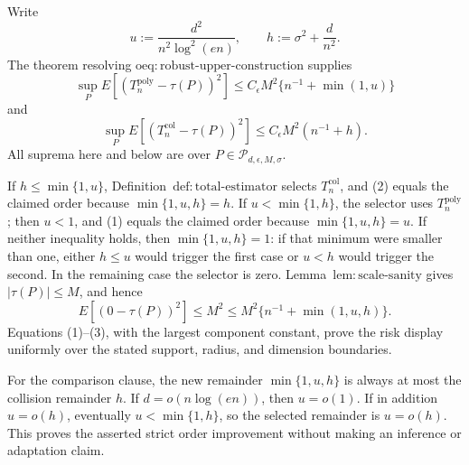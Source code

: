 Write
\[
 u:=\frac{d^2}{n^2\log^2(en)},\qquad h:=\sigma^2+\frac d{n^2}.
\]
The theorem resolving \(\mathrm{oeq:robust\text{-}upper\text{-}construction}\) supplies
\[
 \sup_PE[(T_n^{\mathrm{poly}}-\tau(P))^2]
 \le C_{\epsilon}M^2\{n^{-1}+\min(1,u)\}
\tag{1}
\]
and
\[
 \sup_PE[(T_n^{\mathrm{col}}-\tau(P))^2]
 \le C_{\epsilon}M^2(n^{-1}+h).
\tag{2}
\]
All suprema here and below are over \(P\in\mathcal P_{d,\epsilon,M,\sigma}\).

If \(h\le\min\{1,u\}\), Definition~\(\mathrm{def:total\text{-}estimator}\) selects \(T_n^{\mathrm{col}}\), and (2) equals the claimed order because \(\min\{1,u,h\}=h\).  If \(u<\min\{1,h\}\), the selector uses \(T_n^{\mathrm{poly}}\); then \(u<1\), and (1) equals the claimed order because \(\min\{1,u,h\}=u\).  If neither inequality holds, then \(\min\{1,u,h\}=1\): if that minimum were smaller than one, either \(h\le u\) would trigger the first case or \(u<h\) would trigger the second.  In the remaining case the selector is zero.  Lemma~\(\mathrm{lem:scale\text{-}sanity}\) gives \(|\tau(P)|\le M\), and hence
\[
 E[(0-\tau(P))^2]\le M^2\le M^2\{n^{-1}+\min(1,u,h)\}.
\tag{3}
\]
Equations (1)--(3), with the largest component constant, prove the risk display uniformly over the stated support, radius, and dimension boundaries.

For the comparison clause, the new remainder \(\min\{1,u,h\}\) is always at most the collision remainder \(h\).  If \(d=o(n\log(en))\), then \(u=o(1)\).  If in addition \(u=o(h)\), eventually \(u<\min\{1,h\}\), so the selected remainder is \(u=o(h)\).  This proves the asserted strict order improvement without making an inference or adaptation claim.